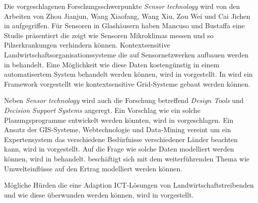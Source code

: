 Die vorgeschlagenen Forschungsschwerpunkte \textit{Sensor technology} wird von den Arbeiten von Zhou Jianjun, Wang Xiaofang, Wang Xiu, Zou Wei und Cai Jichen in \cite{proc:Zhou2013} aufgegriffen. Für Sensoren in Glashäusern haben Mancuso und Bustaffa eine Studie\cite{misc:Mancuso2006} präsentiert die zeigt wie Sensoren Mikroklimas messen und so Pilzerkrankungen verhindern können. Kontextsensitive Landwirtschaftsorganisationssysteme die auf Sensornetzwerken aufbauen werden in \cite{proc:Khaydarov2012} behandelt. Eine Möglichkeit wie diese Daten kostengünstig in einem automatisertem System behandelt werden können, wird in \cite{jour:Kamalesh2014} vorgestellt. In \cite{jour:Shaikh2010} wird ein Framework vorgestellt wie 	kontextsensitive Grid-Systeme gebaut werden können.

Neben \textit{Sensor technology} wird auch die Forschung betreffend \textit{Design Tools} und \textit{Decision Support Systems} angeregt. Ein Vorschlag wie ein solche Planungsprogramme entwickelt werden könnten, wird in \cite{art:Wang2011} vorgeschlagen. Ein Ansatz der GIS-Systeme, Webtechnologie und Data-Mining vereint um ein Expertensystem das verschiedene Bedürfnisse verschiedener Länder beachten kann, wird in \cite{jour:Zhu2009} vorgestellt. Auf die Frage wie solche Daten modelliert werden können, wird in \cite{jour:Schulze2007} behandelt. \cite{jour:Aqeel-ur-Rehman2011} beschäftigt sich mit dem weiterführenden Thema wie Umwelteinflüsse auf den Ertrag modelliert werden können.

Mögliche Hürden die eine Adaption ICT-Lösungen von Landwirtschaftstreibenden und wie diese überwunden werden können, wird in \cite{jour:Aubert2012} vorgestellt.


